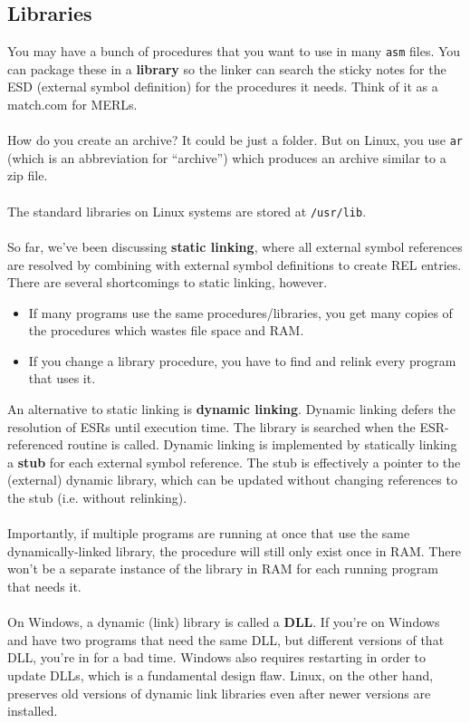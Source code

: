 \documentclass[]{article}
\theoremstyle{definition}
\begin{document}
			\subsection{Libraries}
				You may have a bunch of procedures that you want to use in many \verb+asm+ files. You can package these in a \textbf{library} so the linker can search the sticky notes for the ESD (external symbol definition) for the procedures it needs. Think of it as a match.com for MERLs.
				\\ \\
				How do you create an archive? It could be just a folder. But on Linux, you use \verb+ar+ (which is an abbreviation for ``archive'') which produces an archive similar to a zip file.
				\\ \\
				The standard libraries on Linux systems are stored at \verb+/usr/lib+.
				\\ \\
				So far, we've been discussing \textbf{static linking}, where all external symbol references are resolved by combining with external symbol definitions to create REL entries. There are several shortcomings to static linking, however.
				\begin{itemize}
					\item If many programs use the same procedures/libraries, you get many copies of the procedures which wastes file space and RAM.
					\item If you change a library procedure, you have to find and relink every program that uses it.
				\end{itemize}
				An alternative to static linking is \textbf{dynamic linking}. Dynamic linking defers the resolution of ESRs until execution time. The library is searched when the ESR-referenced routine is called. Dynamic linking is implemented by statically linking a \textbf{stub} for each external symbol reference. The stub is effectively a pointer to the (external) dynamic library, which can be updated without changing references to the stub (i.e. without relinking). 
				\\ \\
				Importantly, if multiple programs are running at once that use the same dynamically-linked library, the procedure will still only exist once in RAM. There won't be a separate instance of the library in RAM for each running program that needs it.
				\\ \\
				On Windows, a dynamic (link) library is called a \textbf{DLL}. If you're on Windows and have two programs that need the same DLL, but different versions of that DLL, you're in for a bad time. Windows also requires restarting in order to update DLLs, which is a fundamental design flaw. Linux, on the other hand, preserves old versions of dynamic link libraries even after newer versions are installed.
\end{document}
